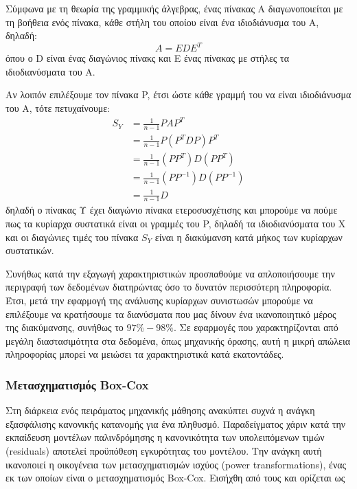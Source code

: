 Σύμφωνα με τη θεωρία της γραμμικής άλγεβρας, ένας πίνακας Α διαγωνοποιείται  με τη βοήθεια ενός πίνακα, κάθε στήλη του οποίου είναι ένα ιδιοδιάνυσμα του Α, δηλαδή:
\begin{equation} 
A=EDE^T
\end{equation} 
όπου ο D είναι ένας διαγώνιος πίνακς και Ε ένας πίνακας με στήλες τα ιδιοδιανύσματα του Α. 

Αν λοιπόν επιλέξουμε τον πίνακα P, έτσι ώστε κάθε γραμμή του να είναι ιδιοδιάνυσμα του A, τότε πετυχαίνουμε:
\begin{equation} 
\begin{split}
S_Y & = \frac{1}{n-1} PAP^T \\
& = \frac{1}{n-1} P(P^TDP)P^T \\
& = \frac{1}{n-1} (PP^T)D(PP^T)\\
& = \frac{1}{n-1}(PP^{-1})D(PP^{-1})\\
& = \frac{1}{n-1} D
\end{split}
\end{equation} 
δηλαδή ο πίνακας Υ έχει διαγώνιο πίνακα ετεροσυσχέτισης και μπορούμε να πούμε πως τα κυρίαρχα συστατικά είναι οι γραμμές του P, δηλαδή τα ιδιοδιανύσματα του X και οι διαγώνιες τιμές του πίνακα $S_Y$ είναι η διακύμανση κατά μήκος των κυρίαρχων συστατικών.

Συνήθως κατά την εξαγωγή χαρακτηριστικών προσπαθούμε να απλοποιήσουμε την περιγραφή των δεδομένων διατηρώντας όσο το δυνατόν περισσότερη πληροφορία. Έτσι, μετά την εφαρμογή της ανάλυσης κυρίαρχων συνιστωσών μπορούμε να επιλέξουμε να κρατήσουμε τα διανύσματα που μας δίνουν ένα ικανοποιητικό μέρος της διακύμανσης, συνήθως το $ 97\% -98\% $. Σε εφαρμογές που χαρακτηρίζονται από μεγάλη διαστασιμότητα στα δεδομένα, όπως μηχανικής όρασης, αυτή η μικρή απώλεια πληροφορίας μπορεί να μειώσει τα χαρακτηριστικά κατά εκατοντάδες.

\subsubsection{Μετασχηματισμός Box-Cox}
Στη διάρκεια ενός πειράματος μηχανικής μάθησης ανακύπτει συχνά η ανάγκη εξασφάλισης κανονικής κατανομής για ένα πληθυσμό. Παραδείγματος χάριν κατά την εκπαίδευση μοντέλων παλινδρόμησης η κανονικότητα των υπολειπόμενων τιμών (residuals) αποτελεί προϋπόθεση εγκυρότητας του μοντέλου. Την ανάγκη αυτή ικανοποιεί η οικογένεια των μετασχηματισμών ισχύος (power transformations), ένας εκ των οποίων είναι ο μετασχηματισμός Box-Cox. Εισήχθη από τους \citet{10.2307/2984418} και ορίζεται ως

